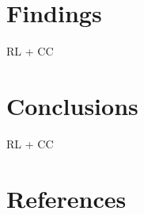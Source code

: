 \documentclass[galley]{jtlu-article-2col}
\begin{document}
\hypertarget{findings}{%
\section{Findings}\label{findings}}

RL + CC

\hypertarget{conclusions}{%
\section{Conclusions}\label{conclusions}}

RL + CC

\hypertarget{references}{%
\section*{References}\label{references}}
\end{document}
